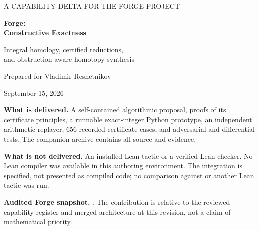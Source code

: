 \documentclass[11pt,letterpaper]{article}
\theoremstyle{definition}\newtheorem{definition}[theorem]{Definition}
\theoremstyle{remark}\newtheorem{remark}[theorem]{Remark}
\newcommand{\code}[1]{\texttt{\detokenize{#1}}}
\begin{document}
\begin{titlepage}
\vspace*{0.5in}
{\large\sffamily\color{muted} A CAPABILITY DELTA FOR THE FORGE PROJECT\par}
\vspace{0.5in}
{\Huge\bfseries\color{ink} Forge:\\[0.15em]Constructive Exactness\par}
\vspace{0.35in}
{\Large Integral homology, certified reductions,\\and obstruction-aware homotopy synthesis\par}
\vspace{0.5in}
{\large Prepared for Vladimir Reshetnikov\par}
{\large September 15, 2026\par}
\vfill
\begin{minipage}{\textwidth}
\textbf{What is delivered.} A self-contained algorithmic proposal, proofs of its
certificate principles, a runnable exact-integer Python prototype, an
independent arithmetic replayer, 656 recorded certificate cases, and adversarial
and differential tests. The companion archive contains all source and evidence.

\textbf{What is not delivered.} An installed Lean tactic or a verified Lean
checker. No Lean compiler was available in this authoring environment. The
integration is specified, not presented as compiled code; no comparison against
\code{grind} or another Lean tactic was run.

\textbf{Audited Forge snapshot.}\quad
{}.
The contribution is relative to the reviewed capability register and merged
architecture at this revision, not a claim of mathematical priority.
\end{minipage}
\end{titlepage}
\end{document}
